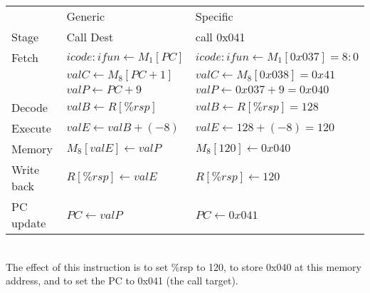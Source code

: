 \documentclass{article}
\begin{document}
\begin{tabular}{l l l}
& Generic & Specific \\
Stage & Call Dest & call 0x041 \\
\hline
Fetch & $icode:ifun \leftarrow M_1[PC]$ & $icode:ifun \leftarrow M_1[0x037]=8:0$ \\
& $valC \leftarrow M_8[PC+1]$ & $valC \leftarrow M_8[0x038]=0x41$ \\
& $valP \leftarrow PC+9$ & $valP \leftarrow 0x037+9=0x040$ \\
Decode & $valB \leftarrow R[\%rsp]$ & $valB \leftarrow R[\%rsp]=128$ \\
Execute & $valE \leftarrow valB + (-8)$ & $valE \leftarrow 128 + (-8)=120$ \\
Memory & $M_8[valE] \leftarrow valP$ & $M_8[120] \leftarrow 0x040$ \\
Write back & $R[\%rsp] \leftarrow valE$ & $R[\%rsp] \leftarrow 120$ \\
PC update & $PC \leftarrow valP$ & $PC \leftarrow 0x041$ \\
\end{tabular} \\
The effect of this instruction is to set \%rsp to 120, to store 0x040 at this memory
address, and to set the PC to 0x041 (the call target). \\
\end{document}
